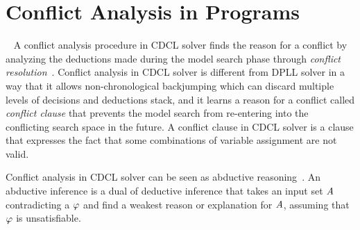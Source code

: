 \section{Conflict Analysis in Programs}~\label{conflict-analysis}
%
A conflict analysis procedure in CDCL solver finds the reason for 
a conflict by analyzing the deductions made during the 
model search phase through \emph{conflict resolution}~\cite{cdcl}. 
Conflict analysis in CDCL solver is different from DPLL solver
in a way that it allows non-chronological backjumping which can discard 
multiple levels of decisions and deductions stack, and it learns a 
reason for a conflict called \emph{conflict clause} that prevents 
the model search from re-entering into the conflicting search space 
in the future.  A conflict clause in CDCL solver is a clause that 
expresses the fact that some combinations of variable assignment 
are not valid.  
%


Conflict analysis in CDCL solver can be seen as abductive
reasoning~\cite{dhk2013-popl}. 
An abductive inference is a dual of deductive inference that takes an input 
set $\mathit{A}$ contradicting a $\varphi$ and find a weakest reason or 
explanation for $\mathit{A}$, assuming that $\varphi$ is unsatisfiable.  



